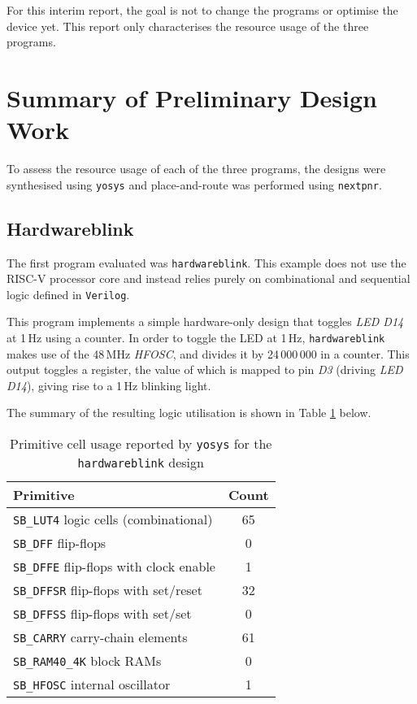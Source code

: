 \documentclass[a4paper,10pt]{article}
\begin{document}
For this interim report, the goal is not to 
change the programs or optimise the device yet.
This report only characterises the resource usage of the three programs.


\section{Summary of Preliminary Design Work}
\label{sec:Summary_of_Preliminary_Design_Work}

To assess the resource usage of each of the three programs, 
the designs were synthesised using \texttt{yosys} 
and place-and-route was performed using \texttt{nextpnr}. 

\subsection{Hardwareblink}
\label{sec:Hardwareblink}

The first program evaluated was \texttt{hardwareblink}.
This example does not use the RISC-V processor core and 
instead relies purely on combinational and 
sequential logic defined in \texttt{Verilog}.

This program implements a simple hardware-only design that 
toggles \textit{LED D14} at 1\,Hz using a counter. 
In order to toggle the LED at 1\,Hz, 
\texttt{hardwareblink} makes use of the 48\,MHz \textit{HFOSC},
and divides it by 24\,000\,000 in a counter.
This output toggles a register, 
the value of which is mapped to pin \textit{D3} (driving \textit{LED D14}),
giving rise to a 1\,Hz blinking light.

The summary of the resulting logic utilisation is shown
in Table \ref{tab:hardware_yosys_report} below.

\begin{table}[H]
    \centering
    \begin{tabular}{|l|c|}
        \hline
        \textbf{Primitive} & \textbf{Count} \\
        \hline
        \texttt{SB\_LUT4} logic cells (combinational) & 65 \\
        \texttt{SB\_DFF} flip-flops & 0 \\
        \texttt{SB\_DFFE} flip-flops with clock enable & 1 \\
        \texttt{SB\_DFFSR} flip-flops with set/reset & 32 \\
        \texttt{SB\_DFFSS} flip-flops with set/set & 0 \\
        \texttt{SB\_CARRY} carry-chain elements & 61 \\
        \texttt{SB\_RAM40\_4K} block RAMs & 0 \\
        \texttt{SB\_HFOSC} internal oscillator & 1 \\
        \hline
    \end{tabular}
    \caption{Primitive cell usage reported by 
    \texttt{yosys} for the \texttt{hardwareblink} design}
    \label{tab:hardware_yosys_report}
\end{table}
\end{document}

